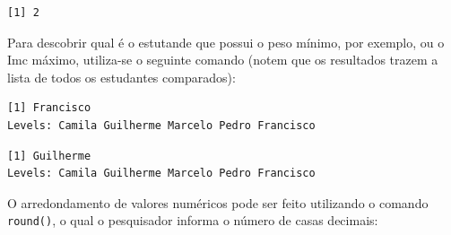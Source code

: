 \documentclass[12pt,portuguese,oneside]{book}
\newenvironment{Shaded}{\begin{snugshade}}{\end{snugshade}}
\newcommand{\KeywordTok}[1]{\textcolor[rgb]{0.13,0.29,0.53}{\textbf{#1}}}
\newcommand{\DecValTok}[1]{\textcolor[rgb]{0.00,0.00,0.81}{#1}}
\newcommand{\CommentTok}[1]{\textcolor[rgb]{0.56,0.35,0.01}{\textit{#1}}}
\newcommand{\OperatorTok}[1]{\textcolor[rgb]{0.81,0.36,0.00}{\textbf{#1}}}
\newcommand{\NormalTok}[1]{#1}
\begin{document}
\begin{Shaded}
\end{Shaded}

\begin{verbatim}
[1] 2
\end{verbatim}

Para descobrir qual é o estutande que possui o peso mínimo, por exemplo,
ou o Imc máximo, utiliza-se o seguinte comando (notem que os resultados
trazem a lista de todos os estudantes comparados):

\begin{Shaded}
\end{Shaded}

\begin{verbatim}
[1] Francisco
Levels: Camila Guilherme Marcelo Pedro Francisco
\end{verbatim}

\begin{Shaded}
\end{Shaded}

\begin{verbatim}
[1] Guilherme
Levels: Camila Guilherme Marcelo Pedro Francisco
\end{verbatim}

O arredondamento de valores numéricos pode ser feito utilizando o
comando \texttt{round()}, o qual o pesquisador informa o número de casas
decimais:

\begin{Shaded}
\end{Shaded}
\end{document}

